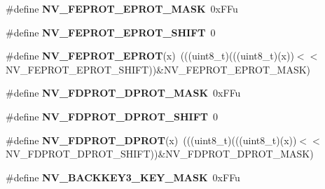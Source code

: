 \begin{DoxyCompactItemize}
\item 
\#define {\bfseries N\+V\+\_\+\+F\+E\+P\+R\+O\+T\+\_\+\+E\+P\+R\+O\+T\+\_\+\+M\+A\+SK}~0x\+F\+Fu\hypertarget{group__NV__Register__Masks_gae309f9fbc7ce46321fbe34e89077fd7a}{}\label{group__NV__Register__Masks_gae309f9fbc7ce46321fbe34e89077fd7a}

\item 
\#define {\bfseries N\+V\+\_\+\+F\+E\+P\+R\+O\+T\+\_\+\+E\+P\+R\+O\+T\+\_\+\+S\+H\+I\+FT}~0\hypertarget{group__NV__Register__Masks_gad725c7b093dfd814cfae3e3fe8522ed2}{}\label{group__NV__Register__Masks_gad725c7b093dfd814cfae3e3fe8522ed2}

\item 
\#define {\bfseries N\+V\+\_\+\+F\+E\+P\+R\+O\+T\+\_\+\+E\+P\+R\+OT}(x)~(((uint8\+\_\+t)(((uint8\+\_\+t)(x))$<$$<$N\+V\+\_\+\+F\+E\+P\+R\+O\+T\+\_\+\+E\+P\+R\+O\+T\+\_\+\+S\+H\+I\+FT))\&N\+V\+\_\+\+F\+E\+P\+R\+O\+T\+\_\+\+E\+P\+R\+O\+T\+\_\+\+M\+A\+SK)\hypertarget{group__NV__Register__Masks_gaa20e7b6ed6390623af67d4ef85a3faf7}{}\label{group__NV__Register__Masks_gaa20e7b6ed6390623af67d4ef85a3faf7}

\item 
\#define {\bfseries N\+V\+\_\+\+F\+D\+P\+R\+O\+T\+\_\+\+D\+P\+R\+O\+T\+\_\+\+M\+A\+SK}~0x\+F\+Fu\hypertarget{group__NV__Register__Masks_ga004ff32c4f18a922a47aaf9adea14d41}{}\label{group__NV__Register__Masks_ga004ff32c4f18a922a47aaf9adea14d41}

\item 
\#define {\bfseries N\+V\+\_\+\+F\+D\+P\+R\+O\+T\+\_\+\+D\+P\+R\+O\+T\+\_\+\+S\+H\+I\+FT}~0\hypertarget{group__NV__Register__Masks_gaf2019bf7c0b8e9dc5efcc385cc50f35b}{}\label{group__NV__Register__Masks_gaf2019bf7c0b8e9dc5efcc385cc50f35b}

\item 
\#define {\bfseries N\+V\+\_\+\+F\+D\+P\+R\+O\+T\+\_\+\+D\+P\+R\+OT}(x)~(((uint8\+\_\+t)(((uint8\+\_\+t)(x))$<$$<$N\+V\+\_\+\+F\+D\+P\+R\+O\+T\+\_\+\+D\+P\+R\+O\+T\+\_\+\+S\+H\+I\+FT))\&N\+V\+\_\+\+F\+D\+P\+R\+O\+T\+\_\+\+D\+P\+R\+O\+T\+\_\+\+M\+A\+SK)\hypertarget{group__NV__Register__Masks_ga47f6e3be836c5d3a4a358a2dfcca5cfe}{}\label{group__NV__Register__Masks_ga47f6e3be836c5d3a4a358a2dfcca5cfe}

\item 
\#define {\bfseries N\+V\+\_\+\+B\+A\+C\+K\+K\+E\+Y3\+\_\+\+K\+E\+Y\+\_\+\+M\+A\+SK}~0x\+F\+Fu\hypertarget{group__NV__Register__Masks_gabe9123bc8137627b30e4f75c757cfb95}{}\label{group__NV__Register__Masks_gabe9123bc8137627b30e4f75c757cfb95}


\end{DoxyCompactItemize}
